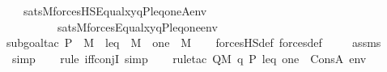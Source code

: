 \begin{isabellebody}
\ \ \ {\isachardoublequoteopen}sats{\isacharparenleft}{\kern0pt}M{\isacharcomma}{\kern0pt}forcesHS{\isacharparenleft}{\kern0pt}Equal{\isacharparenleft}{\kern0pt}x{\isacharcomma}{\kern0pt}y{\isacharparenright}{\kern0pt}{\isacharparenright}{\kern0pt}{\isacharcomma}{\kern0pt}{\isacharbrackleft}{\kern0pt}q{\isacharcomma}{\kern0pt}P{\isacharcomma}{\kern0pt}leq{\isacharcomma}{\kern0pt}one{\isacharcomma}{\kern0pt}A{\isacharbrackright}{\kern0pt}{\isacharat}{\kern0pt}env{\isacharparenright}{\kern0pt}\ {\isasymlongleftrightarrow}\isanewline
\ \ \ \ \ \ \ \ \ sats{\isacharparenleft}{\kern0pt}M{\isacharcomma}{\kern0pt}forces{\isacharparenleft}{\kern0pt}Equal{\isacharparenleft}{\kern0pt}x{\isacharcomma}{\kern0pt}y{\isacharparenright}{\kern0pt}{\isacharparenright}{\kern0pt}{\isacharcomma}{\kern0pt}{\isacharbrackleft}{\kern0pt}q{\isacharcomma}{\kern0pt}P{\isacharcomma}{\kern0pt}leq{\isacharcomma}{\kern0pt}one{\isacharbrackright}{\kern0pt}{\isacharat}{\kern0pt}env{\isacharparenright}{\kern0pt}{\isachardoublequoteclose}\isanewline
%
\isadelimproof
\ \ %
\endisadelimproof
%
\isatagproof
{}\isamarkupfalse%
{\isacharparenleft}{\kern0pt}subgoal{\isacharunderscore}{\kern0pt}tac\ {\isachardoublequoteopen}P\ {\isasymin}\ M\ {\isasymand}\ leq\ {\isasymin}\ M\ {\isasymand}\ one\ {\isasymin}\ M{\isachardoublequoteclose}{\isacharparenright}{\kern0pt}\isanewline
\ \ \isamarkupfalse%
\ forcesHS{\isacharunderscore}{\kern0pt}def\ forces{\isacharunderscore}{\kern0pt}def\ \isanewline
\ \ \isamarkupfalse%
\ assms\isanewline
\ \ \ \isamarkupfalse%
\ simp\isanewline
\ \ \ \isamarkupfalse%
{\isacharparenleft}{\kern0pt}rule\ iff{\isacharunderscore}{\kern0pt}conjI{}{\isacharcomma}{\kern0pt}\ simp{\isacharparenright}{\kern0pt}\isanewline
\ \ \ \isamarkupfalse%
{\isacharparenleft}{\kern0pt}rule{\isacharunderscore}{\kern0pt}tac\ Q{\isacharequal}{\kern0pt}{\isachardoublequoteopen}M{\isacharcomma}{\kern0pt}\ {\isacharbrackleft}{\kern0pt}q{\isacharcomma}{\kern0pt}\ P{\isacharcomma}{\kern0pt}\ leq{\isacharcomma}{\kern0pt}\ one{\isacharbrackright}{\kern0pt}\ {\isacharat}{\kern0pt}\ Cons{\isacharparenleft}{\kern0pt}A{\isacharcomma}{\kern0pt}\ env{\isacharparenright}{\kern0pt}\ {\isasymTurnstile}\ \isanewline

\end{isabellebody}
